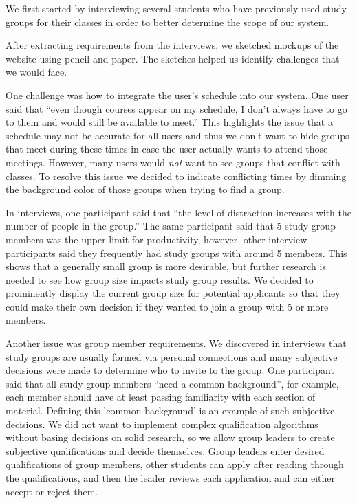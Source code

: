 \documentclass[conference]{IEEEtran}
\begin{document}
We first started by interviewing several students who have previously used study groups for their classes in order to better determine the scope of our system.

After extracting requirements from the interviews, we sketched mockups of the website using pencil and paper.
The sketches helped us identify challenges that we would face.

One challenge was how to integrate the user's schedule into our system.
One user said that ``even though courses appear on my schedule, I don't always have to go to them and would still be available to meet.''
This highlights the issue that a schedule may not be accurate for all users and thus we don't want to hide groups that meet during these times in case the user actually wants to attend those meetings.
However, many users would \emph{not} want to see groups that conflict with classes.
To resolve this issue we decided to indicate conflicting times by dimming the background color of those groups when trying to find a group.


In interviews, one participant said that ``the level of distraction increases with the number of people in the group.''
The same participant said that 5 study group members was the upper limit for productivity, however, other interview participants said they frequently had study groups with around 5 members.
This shows that a generally small group is more desirable, but further research is needed to see how group size impacts study group results.
We decided to prominently display the current group size for potential applicants so that they could make their own decision if they wanted to join a group with 5 or more members.

Another issue was group member requirements.
We discovered in interviews that study groups are usually formed via personal connections and many subjective decisions were made to determine who to invite to the group.
One participant said that all study group members ``need a common background'', for example, each member should have at least passing familiarity with each section of material.
Defining this 'common background' is an example of such subjective decisions.
We did not want to implement complex qualification algorithms without basing decisions on solid research, so we allow group leaders to create subjective qualifications and decide themselves.
Group leaders enter desired qualifications of group members, other students can apply after reading through the qualifications, and then the leader reviews each application and can either accept or reject them.
\end{document}
